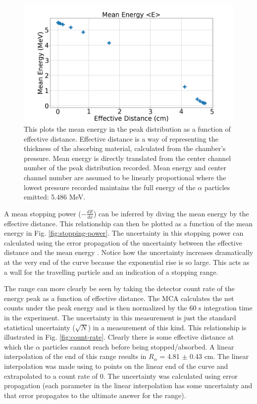 \begin{figure}
\centering
\includegraphics[width=\textwidth]{mean_energy.png}
\caption{This plots the mean energy in the peak distribution as a function of effective distance. Effective distance is a way of representing the thickness of the absorbing material, calculated from the chamber’s pressure. Mean energy is directly translated from the center channel number of the peak distribution recorded. Mean energy and center channel number are assumed to be linearly proportional where the lowest pressure recorded maintains the full energy of the $\alpha$ particles emitted: 5.486 MeV.}
\label{fig:mean-energy}
\end{figure}

 A mean stopping power ($-\frac{dE}{dx}$) can be inferred by diving the mean energy by the effective distance. This relationship can then be plotted as a function of the mean energy in Fig. \ref{fig:stopping-power}. The uncertainty in this stopping power can calculated using the error propagation of the uncertainty between the effective distance and the mean energy \cite{taylor}. Notice how the uncertainty increases dramatically at the very end of the curve because the exponential rise is so large. This acts as a wall for the travelling particle and an indication of a stopping range.

The range can more clearly be seen by taking the detector count rate of the energy peak as a function of effective distance. The MCA calculates the net counts under the peak energy and is then normalized by the 60 s integration time in the experiment. The uncertainty in this measurement is just the standard statistical uncertainty ($\sqrt{N}$) in a measurement of this kind. This relationship is illustrated in Fig. \ref{fig:count-rate}. Clearly there is some effective distance at which the $\alpha$ particles cannot reach before being stopped/absorbed. A linear interpolation of the end of this range results in $R_{\alpha}$ = 4.81 $\pm$ 0.43 cm. The linear interpolation was made using to points on the linear end of the curve and extrapolated to a count rate of 0. The uncertainty was calculated using error propagation (each parameter in the linear interpolation has some uncertainty and that error propagates to the ultimate answer for the range).

